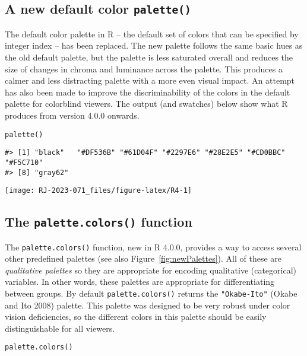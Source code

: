 \hypertarget{a-new-default-color-palette}{%
\subsection{\texorpdfstring{A new default color \texttt{palette()}}{A new default color palette()}}\label{a-new-default-color-palette}}

The default color palette in R -- the default set of colors that can
be specified by integer index -- has been replaced. The new palette
follows the same basic hues as the old default palette, but
the palette is less saturated overall and
reduces the size of changes in chroma and luminance across the palette.
This produces a calmer and less distracting palette with a more
even visual impact.
An attempt has also been made to improve the discriminability
of the colors in the default palette for colorblind viewers.
The output (and swatches) below show what R produces from version 4.0.0
onwards.

\begin{verbatim}
palette()
\end{verbatim}

\begin{verbatim}
#> [1] "black"   "#DF536B" "#61D04F" "#2297E6" "#28E2E5" "#CD0BBC" "#F5C710"
#> [8] "gray62"
\end{verbatim}

\texttt{[image: RJ-2023-071\_files/figure-latex/R4-1]}

\hypertarget{the-palette.colors-function}{%
\subsection{\texorpdfstring{The \texttt{palette.colors()} function}{The palette.colors() function}}\label{the-palette.colors-function}}

The \texttt{palette.colors()} function, new in R 4.0.0, provides a way to
access several other predefined palettes
(see also Figure~\ref{fig:newPalettes}).
All of these are \emph{qualitative palettes} so they are appropriate for
encoding qualitative (categorical) variables. In other words,
these palettes are appropriate for differentiating between groups.
By default \texttt{palette.colors()} returns the
\texttt{"Okabe-Ito"} (Okabe and Ito 2008) palette.
This palette
was designed to be very robust under color vision deficiencies, so
the different colors in this palette should be easily distinguishable
for all viewers.

\begin{verbatim}
palette.colors()
\end{verbatim}

